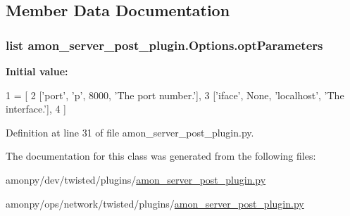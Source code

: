 \subsection{Member Data Documentation}
\hypertarget{classamon__server__post__plugin_1_1_options_af6fcb688391f41e537792928693a9623}{
\subsubsection[{opt\-Parameters}]{\setlength{\rightskip}{0pt plus 5cm}list amon\-\_\-server\-\_\-post\-\_\-plugin.\-Options.\-opt\-Parameters\hspace{0.3cm}{\ttfamily [static]}}}\label{classamon__server__post__plugin_1_1_options_af6fcb688391f41e537792928693a9623}
{\bfseries Initial value\-:}
\begin{DoxyCode}
1 = [
2         [\textcolor{stringliteral}{'port'}, \textcolor{stringliteral}{'p'}, 8000, \textcolor{stringliteral}{'The port number.'}],
3         [\textcolor{stringliteral}{'iface'}, \textcolor{keywordtype}{None}, \textcolor{stringliteral}{'localhost'}, \textcolor{stringliteral}{'The interface.'}],
4         ]
\end{DoxyCode}


Definition at line 31 of file amon\-\_\-server\-\_\-post\-\_\-plugin.\-py.



The documentation for this class was generated from the following files\-:\begin{DoxyCompactItemize}
\item 
amonpy/dev/twisted/plugins/\hyperlink{dev_2twisted_2plugins_2amon__server__post__plugin_8py}{amon\-\_\-server\-\_\-post\-\_\-plugin.\-py}\item 
amonpy/ops/network/twisted/plugins/\hyperlink{ops_2network_2twisted_2plugins_2amon__server__post__plugin_8py}{amon\-\_\-server\-\_\-post\-\_\-plugin.\-py}\end{DoxyCompactItemize}
